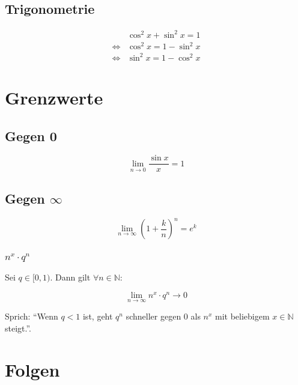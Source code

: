 \documentclass[a4paper, 16pt]{article}
\begin{document}
	\subsection{Trigonometrie}

	\begin{eqnarray*}
		&\cos^2 x + \sin^2 x = 1 \\
		\Leftrightarrow &\cos^2 x = 1 - \sin^2 x \\
		\Leftrightarrow &\sin^2 x = 1 - \cos^2 x
	\end{eqnarray*}

	\section{Grenzwerte}

	\subsection{Gegen 0}

	\begin{equation*}
		\lim\limits_{n \to 0}{\frac{\sin x}{x}} = 1
	\end{equation*}

	\subsection{Gegen $\infty$}

	\begin{equation*}
		\lim\limits_{n \to \infty}{\left(1 + \frac{k}{n}\right)^n} = e^k
	\end{equation*}

	\subsubsection{$n^x \cdot q^n$}

	Sei $q \in [0, 1)$. Dann gilt $\forall n \in \mathbb{N}$:

	\begin{equation*}
		\lim\limits_{n \to \infty}{n^x \cdot q^n} \to 0
	\end{equation*}

	Sprich: \enquote{Wenn $q < 1$ ist, geht $q^n$ schneller gegen 0 als $n^x$ mit beliebigem $x \in \mathbb{N}$ steigt.}.

	\section{Folgen}
\end{document}

